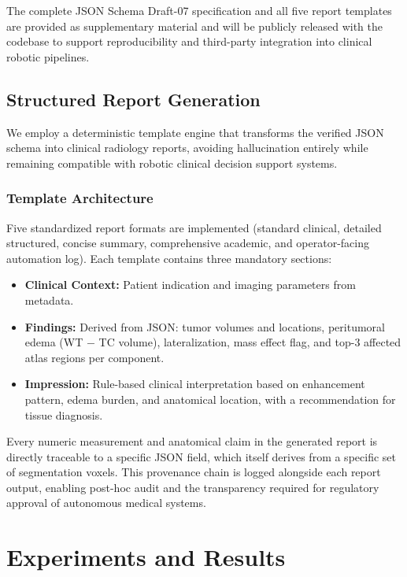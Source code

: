 \documentclass[conference]{IEEEtran}
\begin{document}
The complete JSON Schema Draft-07 specification and all five report templates are provided as supplementary material and will be publicly released with the codebase to support reproducibility and third-party integration into clinical robotic pipelines.

\subsection{Structured Report Generation}

We employ a deterministic template engine that transforms the verified JSON schema into clinical radiology reports, avoiding hallucination entirely while remaining compatible with robotic clinical decision support systems.

\subsubsection{Template Architecture}
Five standardized report formats are implemented (standard clinical, detailed structured, concise summary, comprehensive academic, and operator-facing automation log). Each template contains three mandatory sections:
\begin{itemize}
    \item \textbf{Clinical Context:} Patient indication and imaging parameters from metadata.
    \item \textbf{Findings:} Derived from JSON: tumor volumes and locations, peritumoral edema (WT $-$ TC volume), lateralization, mass effect flag, and top-3 affected atlas regions per component.
    \item \textbf{Impression:} Rule-based clinical interpretation based on enhancement pattern, edema burden, and anatomical location, with a recommendation for tissue diagnosis.
\end{itemize}

Every numeric measurement and anatomical claim in the generated report is directly traceable to a specific JSON field, which itself derives from a specific set of segmentation voxels. This provenance chain is logged alongside each report output, enabling post-hoc audit and the transparency required for regulatory approval of autonomous medical systems.

\section{Experiments and Results}
\label{sec:results}
\end{document}

